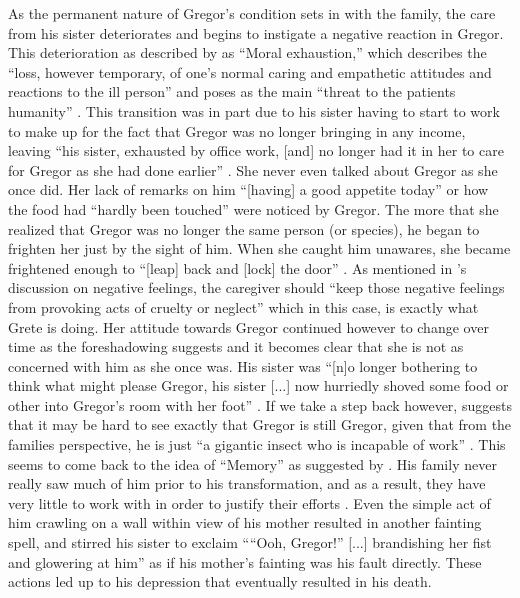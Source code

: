\documentclass{article}
\begin{document}

As the permanent nature of Gregor's condition sets in with the family, the
care from his sister deteriorates and begins to instigate a negative
reaction in Gregor. This deterioration as described by \citeauthor{rowe2002}
as ``Moral exhaustion,'' which describes the ``loss, however temporary, of
one's normal caring and empathetic attitudes and reactions to the ill
person'' and poses as the main ``threat to the patients humanity''
\cite[275, 275, 275]{rowe2002}. This transition was in part due to his
sister having to start to work to make up for the fact that Gregor was no
longer bringing in any income, leaving ``his sister, exhausted by office
work, [and] no longer had it in her to care for Gregor as she had done
earlier'' \cite[131]{kafka2007meta}. She never even talked about Gregor as
she once did. Her lack of remarks on him ``[having] a good appetite today''
or how the food had ``hardly been touched'' \cite[111, 111]{kafka2007meta}
were noticed by Gregor. The more that she realized that Gregor was no longer
the same person (or species), he began to frighten her just by the sight of
him. When she caught him unawares, she became frightened enough to ``[leap]
back and [lock] the door'' \cite[116]{kafka2007meta}. As mentioned in
\citeauthor{rowe2002}'s discussion on negative feelings, the caregiver
should ``keep those negative feelings from provoking acts of cruelty or
neglect'' \cite[265]{rowe2002} which in this case, is exactly what Grete is
doing. Her attitude towards Gregor continued however to change over time as
the foreshadowing suggests and it becomes clear that she is not as concerned
with him as she once was. His sister was ``[n]o longer bothering to think
what might please Gregor, his sister [...] now hurriedly shoved some food or
other into Gregor's room with her foot'' \cite[130]{kafka2007meta}. If we
take a step back however, \citeauthor{cantrellFamily} suggests that it may
be hard to see exactly that Gregor is still Gregor, given that from the
families perspective, he is just ``a gigantic insect who is incapable of
work'' \cite[581]{cantrellFamily}. This seems to come back to the idea of
``Memory'' as suggested by \citeauthor{rowe2002}. His family never really
saw much of him prior to his transformation, and as a result, they have very
little to work with in order to justify their efforts \cite[277]{rowe2002}.
Even the simple act of him crawling on a wall within view of his
mother resulted in another fainting spell, and stirred his sister to exclaim
````Ooh, Gregor!'' [...] brandishing her fist and glowering at him''
\cite[122]{kafka2007meta} as if his mother's fainting was his fault
directly. These actions led up to his depression that eventually
resulted in his death.
\end{document}
